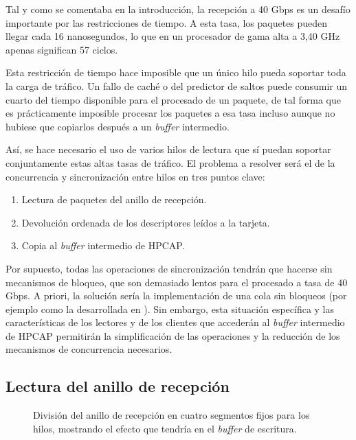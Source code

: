 \documentclass[twoside, 12pt]{epstfg}
\begin{document}
Tal y como se comentaba en la introducción, la recepción a 40 Gbps es un desafío importante por las restricciones de tiempo. A esta tasa, los paquetes pueden llegar cada 16 nanosegundos, lo que en un procesador de gama alta a 3,40 GHz apenas significan 57 ciclos.

Esta restricción de tiempo hace imposible que un único hilo pueda soportar toda la carga de tráfico. Un fallo de caché o del predictor de saltos puede consumir un cuarto del tiempo disponible para el procesado de un paquete, de tal forma que es prácticamente imposible procesar los paquetes a esa tasa incluso aunque no hubiese que copiarlos después a un \textit{buffer} intermedio.

Así, se hace necesario el uso de varios hilos de lectura que sí puedan soportar conjuntamente estas altas tasas de tráfico. El problema a resolver será el de la concurrencia y sincronización entre hilos en tres puntos clave:

\begin{enumerate}[itemsep=0pt, topsep = 0pt]
\item Lectura de paquetes del anillo de recepción.
\item Devolución ordenada de los descriptores leídos a la tarjeta.
\item Copia al \textit{buffer} intermedio de HPCAP.
\end{enumerate}

Por supuesto, todas las operaciones de sincronización tendrán que hacerse sin mecanismos de bloqueo, que son demasiado lentos para el procesado a tasa de 40 Gbps. A priori, la solución sería la implementación de una cola sin bloqueos (por ejemplo como la desarrollada en \cite{krizhanovsky2013lock}). Sin embargo, esta situación específica y las características de los lectores y de los clientes que accederán al \textit{buffer} intermedio de HPCAP permitirán la simplificación de las operaciones y la reducción de los mecanismos de concurrencia necesarios.

\subsection{Lectura del anillo de recepción}

\begin{figure}[hbtp]
\centering

\caption[División del anillo de recepción en cuatro segmentos fijos para los hilos]{División del anillo de recepción en cuatro segmentos fijos para los hilos, mostrando el efecto que tendría en el \textit{buffer} de escritura.}
\label{fig:Desarrollo:RingAssignment}
\end{figure}
\end{document}
